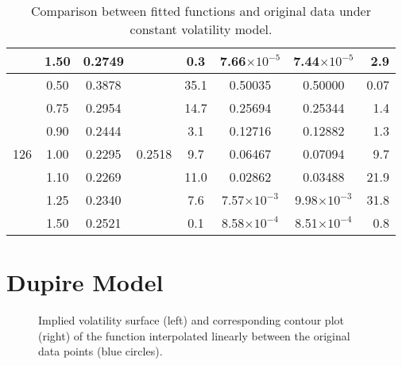 \begin{table}[H]
\begin{tabular}{@{}lccccccr@{}}
&1.50 & 0.2749 &  & 0.3 & 7.66$\times10^{-5}$ & 7.44$\times10^{-5}$ & 2.9 \\\midrule
\multirow{7}{*}{126}&0.50 & 0.3878 &  \multirow{7}{*}{0.2518}& 35.1 & 0.50035 & 0.50000 & 0.07 \\
&0.75 & 0.2954 &  & 14.7 & 0.25694 & 0.25344 & 1.4 \\
&0.90 & 0.2444 &  & 3.1 & 0.12716 & 0.12882 & 1.3 \\
&1.00 & 0.2295 &  & 9.7 & 0.06467 & 0.07094 & 9.7 \\
&1.10 & 0.2269 &  & 11.0 & 0.02862 & 0.03488 & 21.9 \\
&1.25 & 0.2340 &  & 7.6 & 7.57$\times10^{-3}$ & 9.98$\times10^{-3}$ & 31.8 \\
&1.50 & 0.2521 &  & 0.1 & 8.58$\times10^{-4}$ & 8.51$\times10^{-4}$ & 0.8 \\
\bottomrule
\end{tabular}
  \caption[Comparison between fitted results and original data under constant volatility model.]{Comparison between fitted functions and original data under constant volatility model.}
  \label{tab:CV}
\end{table}








\newpage
\section{Dupire Model}

\begin{figure}[H]
  \begin{subfigmatrix}{2}
  \end{subfigmatrix}
    \caption[Implied volatility surface and corresponding contour plot of the function interpolated linearly between the original data points.]{Implied volatility surface (left) and corresponding contour plot (right) of the function interpolated linearly between the original data points (blue circles).}\label{fig:DupImpV}
\end{figure}   


